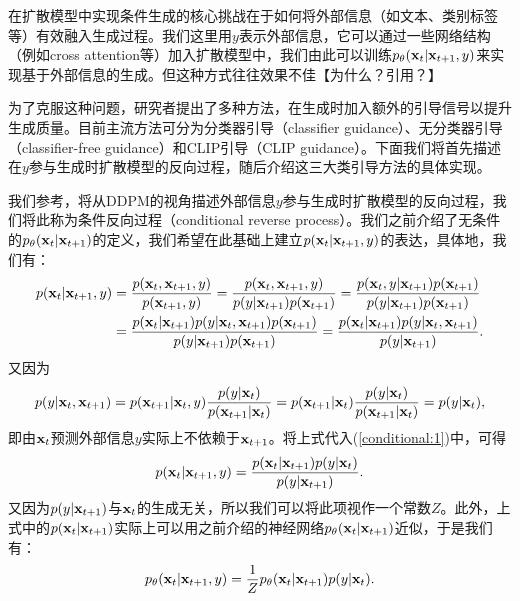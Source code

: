 \documentclass[11pt,a4paper,UTF8]{ctexart}
\begin{document}
在扩散模型中实现条件生成的核心挑战在于如何将外部信息（如文本、类别标签等）有效融入生成过程。我们这里用$y$表示外部信息，它可以通过一些网络结构（例如cross attention等）加入扩散模型中，我们由此可以训练$p_{\theta}(\mathbf{x}_t|\mathbf{x}_{t+1},y)$来实现基于外部信息的生成。但这种方式往往效果不佳【为什么？引用？】

为了克服这种问题，研究者提出了多种方法，在生成时加入额外的引导信号以提升生成质量。目前主流方法可分为分类器引导（classifier guidance）、无分类器引导（classifier-free guidance）和CLIP引导（CLIP guidance）。下面我们将首先描述在$y$参与生成时扩散模型的反向过程，随后介绍这三大类引导方法的具体实现。

我们参考\cite{dhariwal2021diffusion}，将从DDPM的视角描述外部信息$y$参与生成时扩散模型的反向过程，我们将此称为条件反向过程（conditional reverse process）。我们之前介绍了无条件的$p_{\theta}(\mathbf{x}_{t}|\mathbf{x}_{t+1})$的定义，我们希望在此基础上建立$p(\mathbf{x}_{t}|\mathbf{x}_{t+1},y)$的表达，具体地，我们有：
\begin{align}
\begin{split}
    p(\mathbf{x}_{t}|\mathbf{x}_{t+1},y) &= \frac{p(\mathbf{x}_{t},\mathbf{x}_{t+1},y)}{p(\mathbf{x}_{t+1},y)} = \frac{p(\mathbf{x}_{t},\mathbf{x}_{t+1},y)}{p(y|\mathbf{x}_{t+1})p(\mathbf{x}_{t+1})} = \frac{p(\mathbf{x}_{t},y|\mathbf{x}_{t+1})p(\mathbf{x}_{t+1})}{p(y|\mathbf{x}_{t+1})p(\mathbf{x}_{t+1})} \\
    &= \frac{p(\mathbf{x}_{t}|\mathbf{x}_{t+1}) p(y|\mathbf{x}_{t},\mathbf{x}_{t+1})p(\mathbf{x}_{t+1})}{p(y|\mathbf{x}_{t+1})p(\mathbf{x}_{t+1})} = \frac{p(\mathbf{x}_{t}|\mathbf{x}_{t+1}) p(y|\mathbf{x}_{t},\mathbf{x}_{t+1})}{p(y|\mathbf{x}_{t+1})}.
\end{split}
\label{conditional:1}
\end{align}
又因为
\begin{equation*}
    p(y|\mathbf{x}_{t},\mathbf{x}_{t+1})=p(\mathbf{x}_{t+1}|\mathbf{x}_t,y)\frac{p(y|\mathbf{x}_t)}{p(\mathbf{x}_{t+1}|\mathbf{x}_t)} = p(\mathbf{x}_{t+1}|\mathbf{x}_t)\frac{p(y|\mathbf{x}_t)}{p(\mathbf{x}_{t+1}|\mathbf{x}_t)} = p(y|\mathbf{x}_t),
\end{equation*}
即由$\mathbf{x}_t$预测外部信息$y$实际上不依赖于$\mathbf{x}_{t+1}$。将上式代入(\ref{conditional:1})中，可得
\begin{equation*}
    p(\mathbf{x}_{t}|\mathbf{x}_{t+1},y) = \frac{p(\mathbf{x}_{t}|\mathbf{x}_{t+1})p(y|\mathbf{x}_t)}{p(y|\mathbf{x}_{t+1})}.
\end{equation*}
又因为$p(y|\mathbf{x}_{t+1})$与$\mathbf{x}_{t}$的生成无关，所以我们可以将此项视作一个常数$Z$。此外，上式中的$p(\mathbf{x}_{t}|\mathbf{x}_{t+1})$实际上可以用之前介绍的神经网络$p_\theta(\mathbf{x}_{t}|\mathbf{x}_{t+1})$近似，于是我们有：
\begin{equation}
    p_{\theta}(\mathbf{x}_{t}|\mathbf{x}_{t+1},y) = \frac{1}{Z} p_\theta(\mathbf{x}_{t}|\mathbf{x}_{t+1})p(y|\mathbf{x}_t).
\label{conditional:backward}  
\end{equation}
\end{document}

